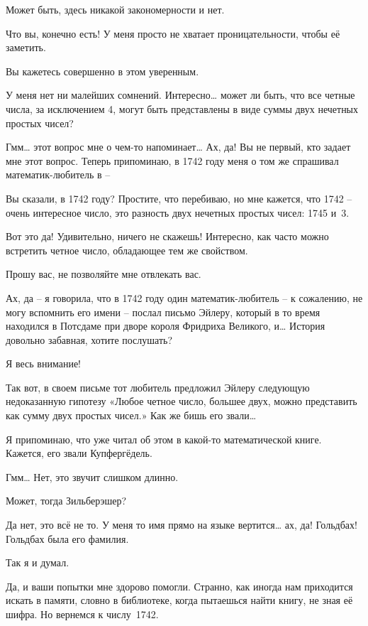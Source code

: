 \documentclass[../main.tex]{subfiles}
\begin{document}
\begin{dialogue}
 Может быть, здесь никакой закономерности и нет.

 Что вы, конечно есть! У меня просто не хватает проницательности, чтобы её заметить.

 Вы кажетесь совершенно в этом уверенным.

 У меня нет ни малейших сомнений. Интересно\ldots{} может ли быть, что все четные числа, за исключением 4, могут быть представлены в виде суммы двух нечетных простых чисел?

 Гмм\ldots{} этот вопрос мне о чем-то напоминает\ldots{} Ах, да! Вы не первый, кто задает мне этот вопрос. Теперь припоминаю, в 1742 году меня о том же спрашивал математик-любитель в \---

 Вы сказали, в 1742 году? Простите, что перебиваю, но мне кажется, что 1742 \--- очень интересное число, это разность двух нечетных простых чисел: 1745 и~3.

 Вот это да! Удивительно, ничего не скажешь! Интересно, как часто можно встретить четное число, обладающее тем же свойством.

 Прошу вас, не позволяйте мне отвлекать вас.

 Ах, да \--- я говорила, что в 1742 году один математик-любитель \--- к сожалению, не могу вспомнить его имени \--- послал письмо Эйлеру, который в то время находился в Потсдаме при дворе короля Фридриха Великого, и\ldots{} История довольно забавная, хотите послушать?

 Я весь внимание!

 Так вот, в своем письме тот любитель предложил Эйлеру следующую недоказанную гипотезу «Любое четное число, большее двух, можно представить как сумму двух простых чисел.» Как же бишь его звали\ldots{}

 Я припоминаю, что уже читал об этом в какой-то математической книге. Кажется, его звали Купфергёдель.

 Гмм\ldots{} Нет, это звучит слишком длинно.

 Может, тогда Зильберэшер?

 Да нет, это всё не то. У меня то имя прямо на языке вертится\ldots{} ах, да! Гольдбах! Гольдбах была его фамилия.

 Так я и думал.

 Да, и ваши попытки мне здорово помогли. Странно, как иногда нам приходится искать в памяти, словно в библиотеке, когда пытаешься найти книгу, не зная её шифра. Но вернемся к числу~1742.


\end{dialogue}
\end{document}
